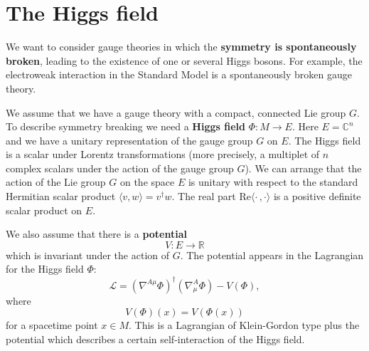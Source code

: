 \documentclass[12pt]{amsart}
\theoremstyle{definition}
\theoremstyle{remark}
\numberwithin{equation}{section}
\begin{document}
\section{The Higgs field}\label{sect higgs field}
We want to consider gauge theories in which the {\bf symmetry is spontaneously broken}, leading to the existence of one or several Higgs bosons. For example, the electroweak interaction in the Standard Model is a spontaneously broken gauge theory.

We assume that we have a gauge theory with a compact, connected Lie group $G$. To describe symmetry breaking we need a {\bf Higgs field} $\Phi\colon M\rightarrow E$. Here $E=\mathbb{C}^n$ and we have a unitary representation of the gauge group $G$ on $E$. The Higgs field is a scalar under Lorentz transformations (more precisely, a multiplet of $n$ complex scalars under the action of the gauge group $G$). We can arrange that the action of the Lie group $G$ on the space $E$ is unitary with respect to the standard Hermitian scalar product $\langle v,w\rangle=v^\dagger w$. The real part $\mathrm{Re}\langle\cdot\,,\cdot\rangle$ is a positive definite scalar product on $E$. 

We also assume that there is a {\bf potential} 
\begin{equation*}
V\colon E\longrightarrow\mathbb{R}
\end{equation*}
which is invariant under the action of $G$. The potential appears in the Lagrangian for the Higgs field $\Phi$:
\begin{equation*}
\mathcal{L}=\left(\nabla^{A\mu}\Phi\right)^\dagger\left(\nabla^{A}_\mu\Phi\right)-V(\Phi),
\end{equation*}
where 
\begin{equation*}
V(\Phi)(x)=V(\Phi(x))
\end{equation*}
for a spacetime point $x\in M$. This is a Lagrangian of Klein-Gordon type plus the potential which describes a certain self-interaction of the Higgs field.
\end{document}

